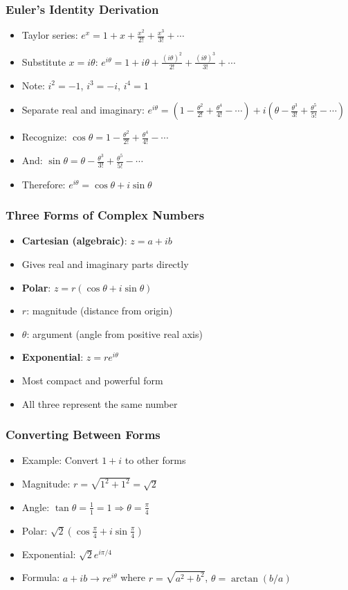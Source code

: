 \begin{frame}[fragile]\frametitle{Euler's Identity Derivation}
  \begin{itemize}
    \item Taylor series: $e^x = 1 + x + \frac{x^2}{2!} + \frac{x^3}{3!} + \cdots$
    \item Substitute $x = i\theta$: $e^{i\theta} = 1 + i\theta + \frac{(i\theta)^2}{2!} + \frac{(i\theta)^3}{3!} + \cdots$
    \item Note: $i^2 = -1$, $i^3 = -i$, $i^4 = 1$
    \item Separate real and imaginary: $e^{i\theta} = \left(1 - \frac{\theta^2}{2!} + \frac{\theta^4}{4!} - \cdots\right) + i\left(\theta - \frac{\theta^3}{3!} + \frac{\theta^5}{5!} - \cdots\right)$
    \item Recognize: $\cos\theta = 1 - \frac{\theta^2}{2!} + \frac{\theta^4}{4!} - \cdots$
    \item And: $\sin\theta = \theta - \frac{\theta^3}{3!} + \frac{\theta^5}{5!} - \cdots$
    \item Therefore: $e^{i\theta} = \cos\theta + i\sin\theta$
  \end{itemize}
\end{frame}

\begin{frame}[fragile]\frametitle{Three Forms of Complex Numbers}
  \begin{itemize}
    \item \textbf{Cartesian (algebraic)}: $z = a + ib$
    \item Gives real and imaginary parts directly
    \item \textbf{Polar}: $z = r(\cos\theta + i\sin\theta)$
    \item $r$: magnitude (distance from origin)
    \item $\theta$: argument (angle from positive real axis)
    \item \textbf{Exponential}: $z = re^{i\theta}$
    \item Most compact and powerful form
    \item All three represent the same number
  \end{itemize}
\end{frame}

\begin{frame}[fragile]\frametitle{Converting Between Forms}
  \begin{itemize}
    \item Example: Convert $1 + i$ to other forms
    \item Magnitude: $r = \sqrt{1^2 + 1^2} = \sqrt{2}$
    \item Angle: $\tan\theta = \frac{1}{1} = 1 \Rightarrow \theta = \frac{\pi}{4}$
    \item Polar: $\sqrt{2}\left(\cos\frac{\pi}{4} + i\sin\frac{\pi}{4}\right)$
    \item Exponential: $\sqrt{2}e^{i\pi/4}$
    \item Formula: $a + ib \to re^{i\theta}$ where $r = \sqrt{a^2+b^2}$, $\theta = \arctan(b/a)$
  \end{itemize}
\end{frame}

